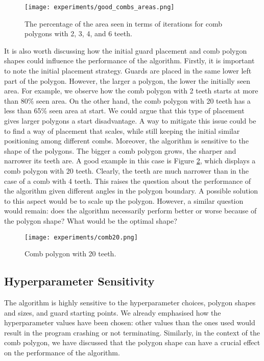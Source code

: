 \begin{figure}[h!]
    \centering
    \texttt{[image: experiments/good\_combs\_areas.png]}
    \caption{The percentage of the area seen in terms of iterations for comb polygons with 2, 3, 4, and 6 teeth.}
    \label{fig:good_combs}
\end{figure}

It is also worth discussing how the initial guard placement and comb polygon shapes could influence the performance of the algorithm.
Firstly, it is important to note the initial placement strategy. Guards are placed in the same lower left part of the polygon. However, the larger a polygon, the lower the initially seen area. For example, we  observe how the comb polygon with 2 teeth starts at more than 80\% seen area. On the other hand, the comb polygon with 20 teeth has a less than 65\% seen area at start. We could argue that this type of placement gives larger polygons a start disadvantage. A way to mitigate this issue could be to find a way of placement that scales, while still keeping the initial similar positioning among different combs.
\newpage
Moreover, the algorithm is sensitive to the shape of the polygons. The bigger a comb polygon grows, the sharper and narrower its teeth are. A good example in this case is Figure \ref{fig:comb20}, which displays a comb polygon with 20 teeth. Clearly, the teeth are much narrower than in the case of a comb with 4 teeth. This raises the question about the performance of the algorithm given different angles in the polygon boundary. A possible solution to this aspect would be to scale up the polygon. However, a similar question would remain: does the algorithm necessarily perform better or worse because of the polygon shape? What would be the optimal shape?

\begin{figure}[h!]
    \centering
    \texttt{[image: experiments/comb20.png]}
    \caption{Comb polygon with 20 teeth.}
    \label{fig:comb20}
\end{figure}

\subsection{Hyperparameter Sensitivity}
\label{sec:hyperparameters}
The algorithm is highly sensitive to the hyperparameter choices, polygon shapes and sizes, and guard starting points. We already emphasised how the hyperparameter values have been chosen: other values than the ones used would result in the program crashing or not terminating. Similarly, in the context of the comb polygon, we have discussed that the polygon shape can have a crucial effect on the performance of the algorithm.

